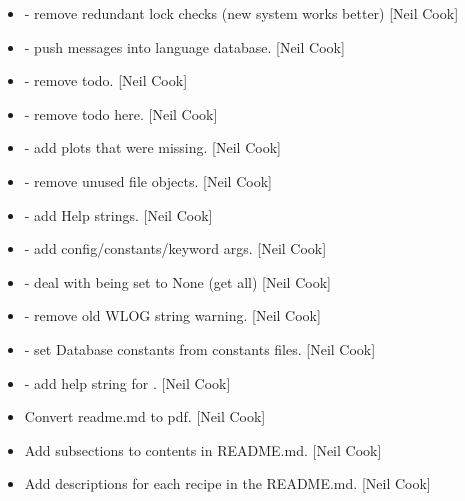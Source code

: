 \documentclass[a4paper,10pt,english]{report}
\begin{document}
\begin{itemize}
\item {} 
 - remove redundant lock checks (new system works
better) {[}Neil Cook{]}

\item {} 
 - push messages into language database. {[}Neil Cook{]}

\item {} 
 - remove todo. {[}Neil Cook{]}

\item {} 
 - remove todo here. {[}Neil Cook{]}

\item {} 
 - add plots that were
missing. {[}Neil Cook{]}

\item {} 
 - remove unused file
objects. {[}Neil Cook{]}

\item {} 
 - add Help strings.
{[}Neil Cook{]}

\item {} 
 - add config/constants/keyword args.
{[}Neil Cook{]}

\item {} 
 - deal with  being set to None
(get all) {[}Neil Cook{]}

\item {} 
 - remove old WLOG string warning. {[}Neil Cook{]}

\item {} 
 - set Database constants from constants
files. {[}Neil Cook{]}

\item {} 
 - add help string for . {[}Neil Cook{]}

\item {} 
Convert readme.md to pdf. {[}Neil Cook{]}

\item {} 
Add subsections to contents in README.md. {[}Neil Cook{]}

\item {} 
Add descriptions for each recipe in the README.md. {[}Neil Cook{]}


\end{itemize}
\end{document}
